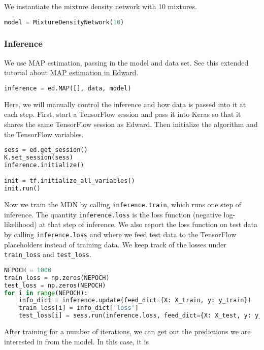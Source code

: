 We instantiate the mixture density network with 10 mixtures.

\begin{lstlisting}[language=Python]
model = MixtureDensityNetwork(10)
\end{lstlisting}

\subsubsection{Inference}

We use MAP estimation, passing
in the model and data set.
See this extended tutorial about
\href{/tutorials/map}{MAP estimation in Edward}.

\begin{lstlisting}[language=Python]
inference = ed.MAP([], data, model)
\end{lstlisting}

Here, we will manually control the inference and how data is passed
into it at each step. First, start a TensorFlow session and pass it
into Keras so that it shares the same TensorFlow session as Edward.
Then initialize the algorithm and the TensorFlow variables.

\begin{lstlisting}[language=Python]
sess = ed.get_session()
K.set_session(sess)
inference.initialize()

init = tf.initialize_all_variables()
init.run()
\end{lstlisting}

Now we train the MDN by calling \texttt{inference.train}, which runs
one step of inference. The quantity \texttt{inference.loss} is the
loss function (negative log-likelihood) at that step of inference.  We
also report the loss function on test data by calling
\texttt{inference.loss} and where we feed test data to the TensorFlow
placeholders instead of training data.
We keep track of the losses under \texttt{train\_loss} and \texttt{test\_loss}.

\begin{lstlisting}[language=Python]
NEPOCH = 1000
train_loss = np.zeros(NEPOCH)
test_loss = np.zeros(NEPOCH)
for i in range(NEPOCH):
    info_dict = inference.update(feed_dict={X: X_train, y: y_train})
    train_loss[i] = info_dict['loss']
    test_loss[i] = sess.run(inference.loss, feed_dict={X: X_test, y: y_test})
\end{lstlisting}

After training for a number of iterations,
we can get out the predictions we are interested in from
the model. In this case, it is

